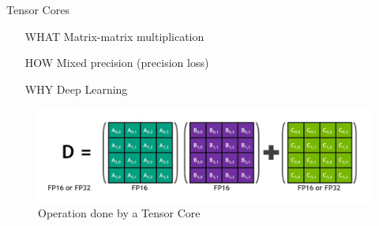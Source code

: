 \begin{frame}{Tensor Cores}
	

		\begin{center}
			\begin{minipage}{0.5\textwidth}

				\begin{itemize}
					\item[WHAT] Matrix-matrix multiplication
					\item[HOW] Mixed precision (precision loss)
					\item[WHY] Deep Learning
				\end{itemize}
			\end{minipage}

			\begin{figure}
				\includegraphics[width=\textwidth]{tensor_core_op}
				\caption{Operation done by a Tensor Core}
			\end{figure}
		\end{center}


	

\end{frame}